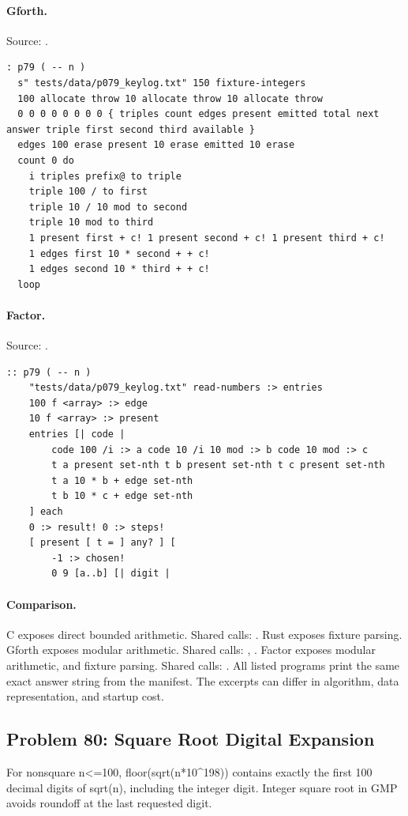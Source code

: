 \paragraph{Gforth.} Source: .
\begin{lstlisting}
: p79 ( -- n )
  s" tests/data/p079_keylog.txt" 150 fixture-integers
  100 allocate throw 10 allocate throw 10 allocate throw
  0 0 0 0 0 0 0 0 { triples count edges present emitted total next answer triple first second third available }
  edges 100 erase present 10 erase emitted 10 erase
  count 0 do
    i triples prefix@ to triple
    triple 100 / to first
    triple 10 / 10 mod to second
    triple 10 mod to third
    1 present first + c! 1 present second + c! 1 present third + c!
    1 edges first 10 * second + + c!
    1 edges second 10 * third + + c!
  loop
\end{lstlisting}

\paragraph{Factor.} Source: .
\begin{lstlisting}
:: p79 ( -- n )
    "tests/data/p079_keylog.txt" read-numbers :> entries
    100 f <array> :> edge
    10 f <array> :> present
    entries [| code |
        code 100 /i :> a code 10 /i 10 mod :> b code 10 mod :> c
        t a present set-nth t b present set-nth t c present set-nth
        t a 10 * b + edge set-nth
        t b 10 * c + edge set-nth
    ] each
    0 :> result! 0 :> steps!
    [ present [ t = ] any? ] [
        -1 :> chosen!
        0 9 [a..b] [| digit |
\end{lstlisting}

\paragraph{Comparison.}
C exposes direct bounded arithmetic. Shared calls: \texttt{}. Rust exposes fixture parsing. Gforth exposes modular arithmetic. Shared calls: \texttt{}, \texttt{}. Factor exposes modular arithmetic, and fixture parsing. Shared calls: \texttt{}.
All listed programs print the same exact answer string from the manifest. The excerpts can differ in algorithm, data representation, and startup cost.

\subsection{Problem 80: Square Root Digital Expansion}
\label{walkthrough:p80}
For nonsquare n<=100, floor(sqrt(n*10\textasciicircum{}198)) contains exactly the first 100 decimal digits of sqrt(n), including the integer digit. Integer square root in GMP avoids roundoff at the last requested digit.

